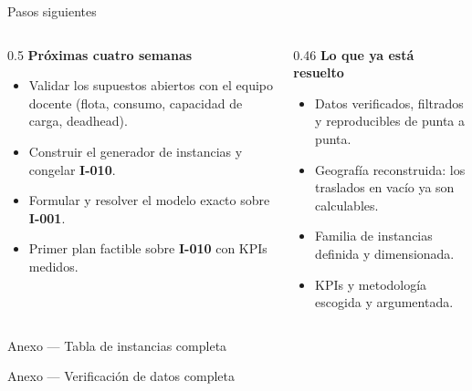 \documentclass[aspectratio=169,11pt]{beamer}
\newcommand{\RES}{../../03-resultados}
\begin{document}
\begin{frame}{Pasos siguientes}
  \small
  \begin{columns}[t]
    \begin{column}{0.5\textwidth}
      {\color{ink}\bfseries Próximas cuatro semanas}
      \begin{itemize}\footnotesize
        \item Validar los supuestos abiertos con el equipo docente
              (flota, consumo, capacidad de carga, deadhead).
        \item Construir el generador de instancias y congelar \textbf{I-010}.
        \item Formular y resolver el modelo exacto sobre \textbf{I-001}.
        \item Primer plan factible sobre \textbf{I-010} con KPIs medidos.
      \end{itemize}
    \end{column}
    \begin{column}{0.46\textwidth}
      {\color{ink}\bfseries Lo que ya está resuelto}
      \begin{itemize}\footnotesize
        \item Datos verificados, filtrados y reproducibles de punta a punta.
        \item Geografía reconstruida: los traslados en vacío ya son calculables.
        \item Familia de instancias definida y dimensionada.
        \item KPIs y metodología escogida y argumentada.
      \end{itemize}
    \end{column}
  \end{columns}
\end{frame}

\appendix
\begin{frame}{Anexo — Tabla de instancias completa}
  \tiny
  
\end{frame}

\begin{frame}{Anexo — Verificación de datos completa}
  \tiny
  
\end{frame}
\end{document}
